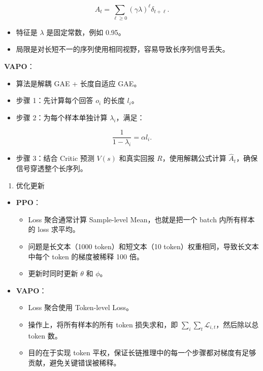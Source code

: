 \[
A_t
=
\sum_{\ell\ge 0}(\gamma\lambda)^\ell\delta_{t+\ell}.
\]

\begin{itemize}
\tightlist
\item
  特征是 \(\lambda\) 是固定常数，例如 0.95。
\item
  局限是对长短不一的序列使用相同视野，容易导致长序列信号丢失。
\end{itemize}

\textbf{VAPO}：

\begin{itemize}
\tightlist
\item
  算法是解耦 GAE + 长度自适应 GAE。
\item
  步骤 1：先计算每个回答 \(o_i\) 的长度 \(l_i\)。
\item
  步骤 2：为每个样本单独计算 \(\lambda_i\)，满足：
\end{itemize}

\[
\frac{1}{1-\lambda_i}
=
\alpha l_i.
\]

\begin{itemize}
\tightlist
\item
  步骤 3：结合 Critic 预测 \(V(s)\) 和真实回报 \(R\)，使用解耦公式计算 \(\hat{A}_t\)，确保信号穿透整个长序列。
\end{itemize}

\begin{enumerate}
\def\labelenumi{\arabic{enumi}.}
\setcounter{enumi}{3}
\tightlist
\item
  优化更新
\end{enumerate}

\begin{itemize}
\tightlist
\item
  \textbf{PPO}：

  \begin{itemize}
  \tightlist
  \item
    Loss 聚合通常计算 Sample-level Mean，也就是把一个 batch 内所有样本的 loss 求平均。
  \item
    问题是长文本（1000 token）和短文本（10 token）权重相同，导致长文本中每个 token 的梯度被稀释 100 倍。
  \item
    更新时同时更新 \(\theta\) 和 \(\phi\)。
  \end{itemize}
\item
  \textbf{VAPO}：

  \begin{itemize}
  \tightlist
  \item
    Loss 聚合使用 Token-level Loss。
  \item
    操作上，将所有样本的所有 token 损失求和，即 \(\sum_i\sum_t \mathcal{L}_{i,t}\)，然后除以总 token 数。
  \item
    目的在于实现 token 平权，保证长链推理中的每一个步骤都对梯度有足够贡献，避免关键错误被稀释。
  \end{itemize}
\end{itemize}

